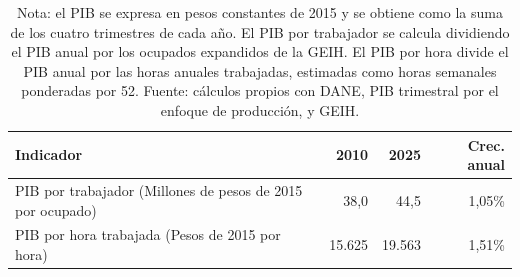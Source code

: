 \begin{table}[H]
\centering
\caption{Productividad laboral agregada a partir del PIB y la GEIH, 2010--2025}
\label{tab:pib_geih_productividad_total}
\small
\begin{tabular}{lrrr}
\toprule
Indicador & 2010 & 2025 & Crec. anual \\
\midrule
PIB por trabajador (Millones de pesos de 2015 por ocupado) & 38,0 & 44,5 & 1,05\% \\
PIB por hora trabajada (Pesos de 2015 por hora) & 15.625 & 19.563 & 1,51\% \\
\bottomrule
\end{tabular}
\caption*{\footnotesize Nota: el PIB se expresa en pesos constantes de 2015 y se obtiene como la suma de los cuatro trimestres de cada año. El PIB por trabajador se calcula dividiendo el PIB anual por los ocupados expandidos de la GEIH. El PIB por hora divide el PIB anual por las horas anuales trabajadas, estimadas como horas semanales ponderadas por 52. Fuente: cálculos propios con DANE, PIB trimestral por el enfoque de producción, y GEIH.}
\end{table}